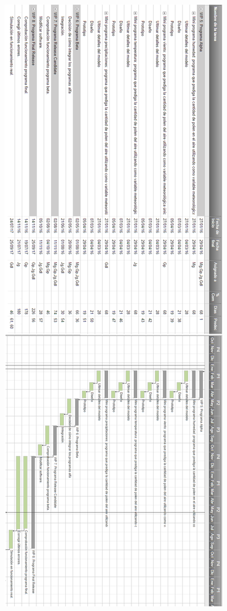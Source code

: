 \documentclass[12pt,oneside,a4paper]{article}
\numberwithin{figure}{section}
\begin{document}
\begin{figure}[H]
\begin{center}
\includegraphics[scale=.45]{Gant4.png}
\end{center}
\end{figure}
\end{document}
